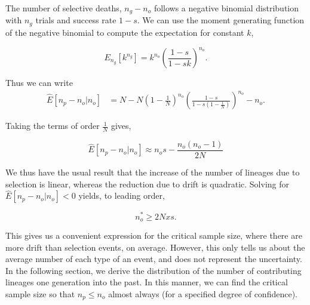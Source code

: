 \documentclass[review]{elsarticle}
\newcommand{\sgcomment}[1]{{\color{red}{SG: #1}}}
\begin{document}
The number of selective deaths, $n_g-n_o$ follows a negative binomial distribution with $n_g$ trials \sgcomment{I believe that this should be successes?}
and success rate $1-s$. We can use the moment generating function of the negative binomial to compute the expectation for
constant $k$,

\begin{equation}
E_{n_g}[k^{n_g}] = k^{n_o}  \left(\frac{1-s}{1-sk}\right)^{n_o}.
\label{eq:identity}
\end{equation} 

Thus we can write 
\begin{align}
  \label{eq:lineages-exact}
  \hat{E}[n_p -n_o | n_o] &= N-N\left( 1 - \frac{1}{N} \right)^{n_o}\left( \frac{1-s}{1-s \left( 1 - \frac{1}{N} \right)}\right)^{n_o}-n_o.
\end{align}

Taking the terms of order $\frac{1}{N}$ gives,

\begin{equation*}
    \label{eq:lineages-approx}
    \hat{E}[n_p-n_o | n_o] \approx n_os - \frac{n_o (n_o-1) }{2N}  
\end{equation*}

We thus have the usual result that the increase of the number of lineages due to selection is
linear, whereas the reduction due to drift is quadratic. Solving for $ \hat{E}[n_p -n_o | n_o]<0$
yields, to leading order,

\begin{equation}
  \label{eq:critical-sample}
  n_o^* \ge 2Nxs.
\end{equation}

This gives us a convenient expression for the critical sample size, where there are more drift than
selection events, on average. However, this only tells us about the average number of each type of
an event, and does not represent the uncertainty. In the following section, we derive the
distribution of the number of contributing lineages one generation into the past. In this manner, we
can find the critical sample size so that $n_p \leq n_o$ almost always (for a specified degree of
confidence).

\end{document}
